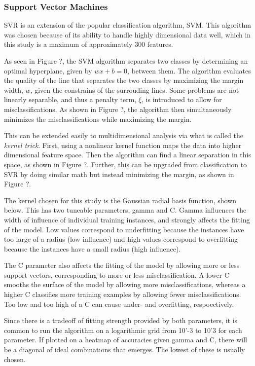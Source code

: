 \subsubsection{Support Vector Machines}
\label{sec:svm}

\gls{SVR} is an extension of the popular classification algorithm, \gls{SVM}.
This algorithm was chosen because of its ability to handle highly dimensional
data well, which in this study is a maximum of approximately 300 features. 

As seen in Figure ?, the \gls{SVM} algorithm separates
two classes by determining an optimal hyperplane, given by $wx+b = 0$, between
them. The algorithm evaluates the quality of the line that separates the two
classes by maximizing the margin width, $w$, given the constrains of the
surrouding lines.  Some problems are not linearly separable, and thus a penalty
term, $\xi$, is introduced to allow for misclassifications. As shown in Figure
?, the algorithm then simultaneously minimizes the misclassifications while
maximizing the margin. 

This can be extended easily to multidimensional analysis via what is called the
\textit{kernel trick}.  First, using a nonlinear kernel function maps the data
into higher dimensional feature space. Then the algorithm can find a linear
separation in this space, as shown in Figure ?. Further, this can be upgraded
from classification to SVR by doing similar math but instead minimizing the
margin, as shown in Figure ?. 

The kernel chosen for this study is the Gaussian radial basis function, shown
below. This has two tuneable parameters, gamma and C. Gamma influences the
width of influence of individual training instances, and strongly affects the
fitting of the model. Low values correspond to underfitting because the
instances have too large of a radius (low influence) and high values correspond
to overfitting because the instances have a small radius (high influence). 

The C parameter also affects the fitting of the model by allowing more or less
support vectors, corresponding to more or less misclassification. A lower C
smooths the surface of the model by allowing more misclassifications, whereas a
higher C classifies more training examples by allowing fewer
misclassifications. Too low and too high of a C can cause under- and
overfitting, respoectively. 

Since there is a tradeoff of fitting strength provided by both parameters, it
is common to run the algorithm on a logarithmic grid from 10'-3 to 10'3 for
each parameter. If plotted on a heatmap of accuracies given gamma and C, there
will be a diagonal of ideal combinations that emerges. The lowest of these is
usually chosen. 

